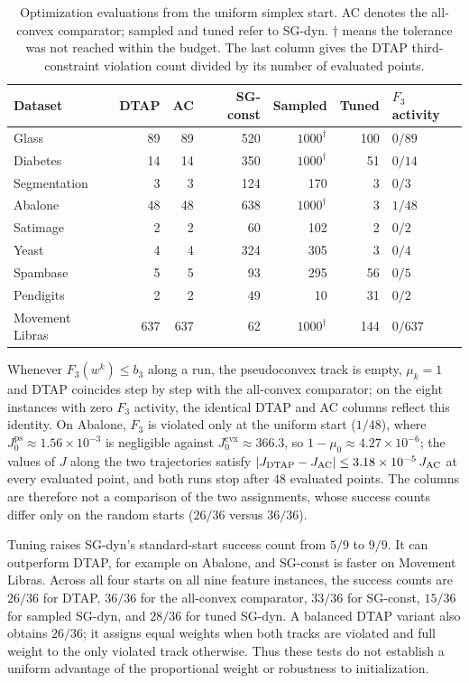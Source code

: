 \documentclass[]{interact}
\theoremstyle{plain}
\theoremstyle{definition}
\theoremstyle{remark}
\newcommand{\cvx}{\mathrm{cvx}}
\newcommand{\ps}{\mathrm{ps}}
\begin{document}
\begin{table}[t]
\centering\small
\setlength{\tabcolsep}{4pt}
\caption{Optimization evaluations from the uniform simplex start.
AC denotes the all-convex comparator; sampled and tuned refer to SG-dyn.
$\dagger$ means the tolerance was not reached within the budget.
The last column gives the DTAP third-constraint violation count divided
by its number of evaluated points.}
\label{tab:activation-tuning}
\begin{tabular}{@{}lrrrrrl@{}}
\toprule
Dataset & DTAP & AC & SG-const & Sampled & Tuned & $F_3$ activity\\
\midrule
Glass        & 89 & 89 & 520 & $1000^\dagger$ & 100 & $0/89$\\
Diabetes     & 14 & 14 & 350 & $1000^\dagger$ & 51 & $0/14$\\
Segmentation & 3 & 3 & 124 & 170 & 3 & $0/3$\\
Abalone      & 48 & 48 & 638 & $1000^\dagger$ & 3 & $1/48$\\
Satimage     & 2 & 2 & 60 & 102 & 2 & $0/2$\\
Yeast        & 4 & 4 & 324 & 305 & 3 & $0/4$\\
Spambase     & 5 & 5 & 93 & 295 & 56 & $0/5$\\
Pendigits    & 2 & 2 & 49 & 10 & 31 & $0/2$\\
\midrule
Movement Libras & 637 & 637 & 62 & $1000^\dagger$ & 144 & $0/637$\\
\bottomrule
\end{tabular}
\end{table}

Whenever $F_3(w^k)\le b_3$ along a run, the pseudoconvex track is empty,
$\mu_k=1$ and DTAP coincides step by step with the all-convex comparator;
on the eight instances with zero $F_3$ activity, the identical DTAP and AC
columns reflect this identity. On Abalone, $F_3$ is violated only at the uniform
start ($1/48$), where $J^{\ps}_0\approx1.56\times10^{-3}$ is negligible against
$J^{\cvx}_0\approx366.3$, so $1-\mu_0\approx4.27\times10^{-6}$; the values of $J$
along the two trajectories satisfy $|J_{\rm DTAP}-J_{\rm AC}|\le3.18\times10^{-5}\,J_{\rm AC}$ at
every evaluated point,
and both runs stop after $48$ evaluated points. The columns
are therefore not a comparison of the two assignments, whose success counts
differ only on the random starts ($26/36$ versus $36/36$).

Tuning raises SG-dyn's standard-start success count from $5/9$ to $9/9$.
It can outperform DTAP, for example on Abalone, and SG-const is faster
on Movement Libras. Across all four starts on all nine feature instances,
the success counts are $26/36$ for DTAP, $36/36$ for the all-convex
comparator, $33/36$ for SG-const, $15/36$ for sampled SG-dyn, and $28/36$
for tuned SG-dyn. A balanced DTAP variant also obtains $26/36$; it assigns
equal weights when both tracks are violated and full weight to the only violated track
otherwise. Thus these tests do not establish a uniform advantage of the proportional weight
or robustness to initialization.
\end{document}
